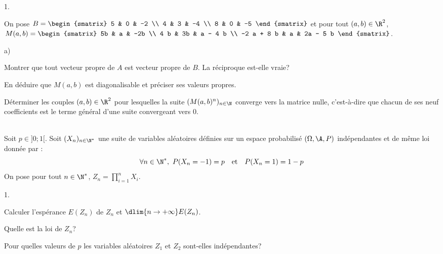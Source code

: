 \documentclass[11pt]{article}%
\begin{document}
\begin{exerciceAP}
\begin{noliste}{1.}
  \item On pose $B = 
    \begin{smatrix} 
      5 & 0 & -2 \\
      4 & 3 & -4 \\
      8 & 0 & -5
    \end{smatrix}$ et pour tout $(a,b) \in \R^2$, $M(a, b) = 
    \begin{smatrix} 
      5b & a & -2b \\
      4 b & 3b & a - 4 b \\
      -2 a + 8 b & a & 2a - 5 b 
    \end{smatrix}$.

    \begin{noliste}{a)}
    \setlength{\itemsep}{2mm}
    \item Montrer que tout vecteur propre de $A$ est vecteur propre de
      $B$. La réciproque est-elle vraie?
    \item En déduire que $M(a,b)$ est diagonalisable et préciser ses
      valeurs propres.
    \item Déterminer les couples $(a,b) \in \R^2$ pour lesquelles la
      suite $( M(a,b)^n )_{ n \in \N }$ converge vers la matrice
      nulle, c'est-à-dire que chacun de ses neuf coefficients est le
      terme général d'une suite convergeant vers 0.
    \end{noliste}
  \end{noliste}
\end{exerciceAP}


\begin{exerciceSP}~\\
  Soit $p \in ]0;1[$. Soit $(X_n)_{ n \in \N^* }$ une suite de
  variables aléatoires définies sur un espace probabilisé $(\Omega ,
  \A , P )$ indépendantes et de même loi donnée par :
  \[
  \forall n \in \N^* , \ P (X_n = -1) = p \ \ \text{ et } \ \ P (X_n =
  1) = 1 - p
  \]
  On pose pour tout $n \in \N^*$, $Z_n = \prod\limits_{i=1}^n X_i$.
  \begin{noliste}{1.}
    \setlength{\itemsep}{2mm}
  \item Calculer l'espérance $E (Z_n) $ de $Z_n$ et $\dlim{ n
      \rightarrow + \infty } E (Z_n)$.
  \item Quelle est la loi de $Z_n$?
  \item Pour quelles valeurs de $p$ les variables aléatoires $Z_1$ et
    $Z_2$ sont-elles indépendantes?
  \end{noliste}
\end{exerciceSP}
\end{document}
